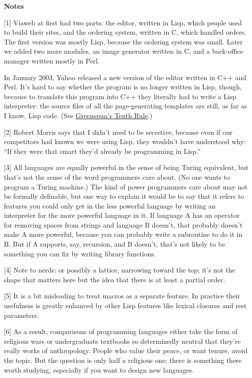 \textbf{Notes}

{[}1{]} Viaweb at first had two parts: the editor, written in Lisp,
which people used to build their sites, and the ordering system, written
in C, which handled orders. The first version was mostly Lisp, because
the ordering system was small. Later we added two more modules, an image
generator written in C, and a back-office manager written mostly in
Perl.

In January 2003, Yahoo released a new version of the editor written in
C++ and Perl. It's hard to say whether the program is no longer written
in Lisp, though, because to translate this program into C++ they
literally had to write a Lisp interpreter: the source files of all the
page-generating templates are still, as far as I know, Lisp code. (See
\href{quotes.html}{Greenspun's Tenth Rule}.)

{[}2{]} Robert Morris says that I didn't need to be secretive, because
even if our competitors had known we were using Lisp, they wouldn't have
understood why: ``If they were that smart they'd already be programming
in Lisp.''

{[}3{]} All languages are equally powerful in the sense of being Turing
equivalent, but that's not the sense of the word programmers care about.
(No one wants to program a Turing machine.) The kind of power
programmers care about may not be formally definable, but one way to
explain it would be to say that it refers to features you could only get
in the less powerful language by writing an interpreter for the more
powerful language in it. If language A has an operator for removing
spaces from strings and language B doesn't, that probably doesn't make A
more powerful, because you can probably write a subroutine to do it in
B. But if A supports, say, recursion, and B doesn't, that's not likely
to be something you can fix by writing library functions.

{[}4{]} Note to nerds: or possibly a lattice, narrowing toward the top;
it's not the shape that matters here but the idea that there is at least
a partial order.

{[}5{]} It is a bit misleading to treat macros as a separate feature. In
practice their usefulness is greatly enhanced by other Lisp features
like lexical closures and rest parameters.

{[}6{]} As a result, comparisons of programming languages either take
the form of religious wars or undergraduate textbooks so determinedly
neutral that they're really works of anthropology. People who value
their peace, or want tenure, avoid the topic. But the question is only
half a religious one; there is something there worth studying,
especially if you want to design new languages.
